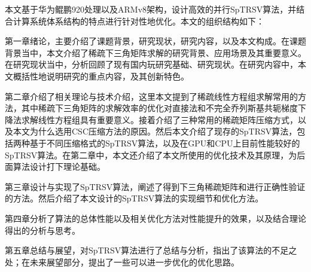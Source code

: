 本文基于华为鲲鹏920处理以及ARMv8架构，设计高效的并行SpTRSV算法，并结合计算系统体系结构的特点进行针对性地优化。本文的组织结构如下：

第一章绪论，主要介绍了课题背景，研究现状，研究内容，以及本文构成。在课题背景当中，本文介绍了稀疏下三角矩阵求解的研究背景、应用场景及其重要意义。在研究现状当中，分析回顾了现有国内玩研究基础、研究现状。在研究内容中，本文概括性地说明研究的重点内容，及其创新特色。

第二章介绍了相关理论与技术介绍，这里本文提到了稀疏线性方程组求解常用的方法，其中稀疏下三角矩阵的求解效率的优化对直接法和不完全乔列斯基共轭梯度下降法求解线性方程组具有重要意义。接着介绍了三种常用的稀疏矩阵压缩方式，以及本文为什么选用CSC压缩方法的原因。然后本文介绍了现存的SpTRSV算法，包括两种基于不同压缩格式的SpTRSV算法，以及在GPU和CPU上目前性能较好的SpTRSV算法。在第二章中，本文还介绍了本文所使用的优化技术及其原理，为后面算法设计打下理论基础。

第三章设计与实现了SpTRSV算法，阐述了得到下三角稀疏矩阵和进行正确性验证的方法。然后介绍了本文设计的SpTRSV算法的实现细节和优化方法。

第四章分析了算法的总体性能以及相关优化方法对性能提升的效果，以及结合理论得出的分析与思考。

第五章总结与展望，对SpTRSV算法进行了总结与分析，指出了该算法的不足之处；在未来展望部分，提出了一些可以进一步优化的优化思路。

\endinput

